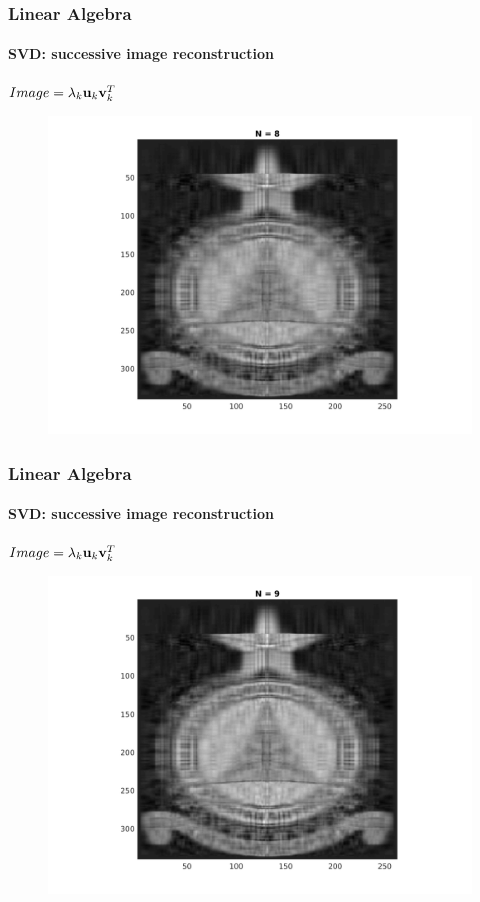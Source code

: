 \documentclass[hyperref={pdfpagelabels=true}]{beamer}
\begin{document}
\begin{frame}
\frametitle{Linear Algebra}
\framesubtitle{SVD: successive image reconstruction} 
\small{
\begin{center}
$Image = \lambda_k{\bf u}_k {\bf v}_k^T$
\end{center}}
\begin{figure}[!htb]
\centering
\includegraphics [scale=0.48]{n/b8.png}
\end{figure}
\end{frame}

\begin{frame}
\frametitle{Linear Algebra}
\framesubtitle{SVD: successive image reconstruction} 
\small{
\begin{center}
$Image = \lambda_k{\bf u}_k {\bf v}_k^T$
\end{center}}
\begin{figure}[!htb]
\centering
\includegraphics [scale=0.48]{n/b9.png}
\end{figure}
\end{frame}
\end{document}
